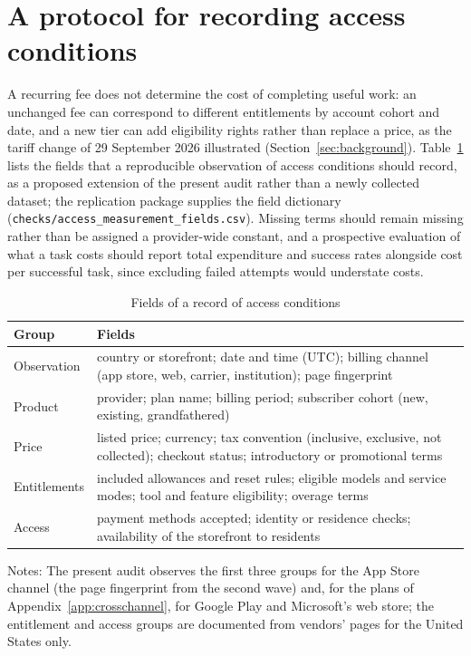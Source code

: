 \documentclass[11pt]{article}
\theoremstyle{definition}
\theoremstyle{remark}
\begin{document}
\section{A protocol for recording access conditions}\label{app:protocol}

A recurring fee does not determine the cost of completing useful work: an unchanged fee can correspond to different entitlements by account cohort and date, and a new tier can add eligibility rights rather than replace a price, as the tariff change of 29 September 2026 illustrated (Section~\ref{sec:background}). Table~\ref{tab:protocol} lists the fields that a reproducible observation of access conditions should record, as a proposed extension of the present audit rather than a newly collected dataset; the replication package supplies the field dictionary (\nolinkurl{checks/access_measurement_fields.csv}). Missing terms should remain missing rather than be assigned a provider-wide constant, and a prospective evaluation of what a task costs should report total expenditure and success rates alongside cost per successful task, since excluding failed attempts would understate costs.

\begin{table}[ht]\centering\begin{threeparttable}
\caption{Fields of a record of access conditions}\label{tab:protocol}
\footnotesize\begin{tabular}{@{}>{\raggedright\arraybackslash}p{3.4cm}>{\raggedright\arraybackslash}p{9.6cm}@{}}\toprule
Group & Fields \\\midrule
Observation & country or storefront; date and time (UTC); billing channel (app store, web, carrier, institution); page fingerprint \\
Product & provider; plan name; billing period; subscriber cohort (new, existing, grandfathered) \\
Price & listed price; currency; tax convention (inclusive, exclusive, not collected); checkout status; introductory or promotional terms \\
Entitlements & included allowances and reset rules; eligible models and service modes; tool and feature eligibility; overage terms \\
Access & payment methods accepted; identity or residence checks; availability of the storefront to residents \\
\bottomrule\end{tabular}
\begin{tablenotes}[flushleft]\footnotesize\item Notes: The present audit observes the first three groups for the App Store channel (the page fingerprint from the second wave) and, for the plans of Appendix~\ref{app:crosschannel}, for Google Play and Microsoft's web store; the entitlement and access groups are documented from vendors' pages for the United States only.\end{tablenotes}
\end{threeparttable}\end{table}
\end{document}
